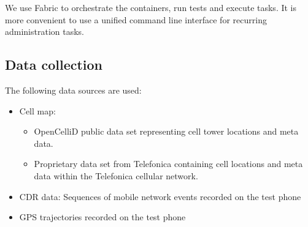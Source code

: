 We use Fabric to orchestrate the containers, run tests and execute tasks. It is more convenient to use a unified command line interface for recurring administration tasks. \cite{fabric}

\subsection{Data collection}
The following data sources are used:
\begin{itemize}
\item Cell map:
\begin{itemize}
    \item OpenCelliD public data set representing cell tower locations and meta data.
    \item Proprietary data set from Telefonica containing cell locations and meta data within the Telefonica cellular network.
\end{itemize}
\item CDR data: Sequences of mobile network events recorded on the test phone
\item GPS trajectories recorded on the test phone
\end{itemize}

